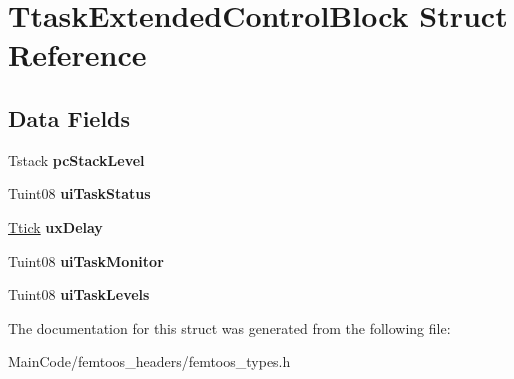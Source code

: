 \hypertarget{struct_ttask_extended_control_block}{\section{Ttask\-Extended\-Control\-Block Struct Reference}
\label{struct_ttask_extended_control_block}
}
\subsection*{Data Fields}
\begin{DoxyCompactItemize}
\item 
\hypertarget{struct_ttask_extended_control_block_ae07c1c1c282861b77fbf92d7f318cf27}{Tstack {\bfseries pc\-Stack\-Level}}\label{struct_ttask_extended_control_block_ae07c1c1c282861b77fbf92d7f318cf27}

\item 
\hypertarget{struct_ttask_extended_control_block_ad61a88ca7207c2b8c5d1b0fff3b5919d}{Tuint08 {\bfseries ui\-Task\-Status}}\label{struct_ttask_extended_control_block_ad61a88ca7207c2b8c5d1b0fff3b5919d}

\item 
\hypertarget{struct_ttask_extended_control_block_a51012b67b50690905ea6ad0db3ea5db4}{\hyperlink{union_ttick}{Ttick} {\bfseries ux\-Delay}}\label{struct_ttask_extended_control_block_a51012b67b50690905ea6ad0db3ea5db4}

\item 
\hypertarget{struct_ttask_extended_control_block_a4d1597e86ec08850e7e2f4cc9aca7115}{Tuint08 {\bfseries ui\-Task\-Monitor}}\label{struct_ttask_extended_control_block_a4d1597e86ec08850e7e2f4cc9aca7115}

\item 
\hypertarget{struct_ttask_extended_control_block_a19de8fdd4a90ba7bd4be2eef48ba0e19}{Tuint08 {\bfseries ui\-Task\-Levels}}\label{struct_ttask_extended_control_block_a19de8fdd4a90ba7bd4be2eef48ba0e19}

\end{DoxyCompactItemize}


The documentation for this struct was generated from the following file\-:\begin{DoxyCompactItemize}
\item 
Main\-Code/femtoos\-\_\-headers/femtoos\-\_\-types.\-h\end{DoxyCompactItemize}
